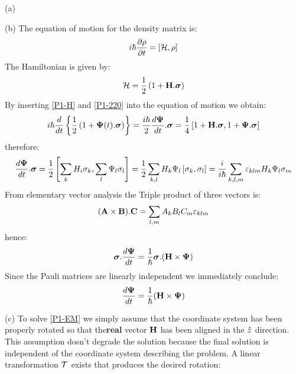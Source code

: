 \begin{homeworkProblem}
\begin{homeworkSection}{(a)}
\end{homeworkSection}
\begin{homeworkSection}{(b)}
The equation of motion for the density matrix is:
\begin{equation}
i\hbar\dfrac{\partial \rho}{\partial t}=[\mathcal{H},\rho]
\end{equation}
The Hamiltonian is given by:
\begin{equation}\label{P1-H}
\mathcal{H}=\frac{1}{2}\left(1+\mathbf{H}.\boldsymbol{\sigma}\right)
\end{equation}
By inserting \eqref{P1-H} and \eqref{P1-220} into the equation of motion we obtain:
\begin{equation}
i\hbar\frac{d}{dt}\left\{\frac{1}{2}\left(1+\mathbf{\Psi}(t).\boldsymbol{\sigma}\right)\right\}=\frac{i\hbar}{2}\frac{d\mathbf{\Psi}}{dt}.\boldsymbol{\sigma}=\frac{1}{4}\left[1+\mathbf{H}.\boldsymbol{\sigma},1+\mathbf{\Psi}.\boldsymbol{\sigma}\right]
\end{equation}
therefore:
\begin{equation}
\frac{d\mathbf{\Psi}}{dt}.\boldsymbol{\sigma}=\frac{1}{2}\left[\sum_k H_i\sigma_k,\sum_l\Psi_l\sigma_l\right]=\frac{1}{2}\sum_{k,l}H_k\Psi_l\left[\sigma_k,\sigma_l\right]=\frac{i}{i\hbar}\sum_{k,l,m}\varepsilon_{klm}H_k\Psi _l\sigma_m
\end{equation}
From elementary vector analysis the Triple product of three vectors is:
\begin{equation*}
(\mathbf{A}\times\mathbf{B}).\mathbf{C}=\sum_{l,m}A_kB_lC_m\varepsilon_{klm}
\end{equation*} 
hence:
\begin{equation}
\boldsymbol{\sigma}.\frac{d\mathbf{\Psi}}{dt}=\frac{1}{\hbar}\boldsymbol{\sigma}.(\mathbf{H}\times\mathbf{\Psi})
\end{equation}
Since the Pauli matrices are linearly independent we immediately conclude:
\begin{equation}\label{P1-EM}
\frac{d\mathbf{\Psi}}{dt}=\frac{1}{\hbar}(\mathbf{H}\times\mathbf{\Psi})
\end{equation}
\end{homeworkSection}
\begin{homeworkSection}{(c)}
To solve \eqref{P1-EM} we simply assume that the coordinate system has been properly rotated so that the\textbf{real} vector $\mathbf{H}$ has been aligned in the $\Hat{z}$ direction. This assumption dosn't degrade the solution because the final solution is independent of the coordinate system describing the problem. A linear transformation $\mathcal{T}$  exists that produces the desired rotation:
\begin{equation}

\end{equation}
\end{homeworkSection}
\end{homeworkProblem}
